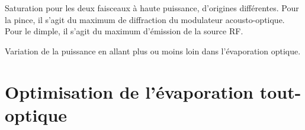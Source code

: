 Saturation pour les deux faisceaux à haute puissance, d'origines différentes. Pour la pince, il s'agit du maximum de diffraction du modulateur acousto-optique. Pour le dimple, il s'agit du maximum d'émission de la source RF. 

Variation de la puissance en allant plus ou moins loin dans l'évaporation optique.










\section{Optimisation de l'évaporation tout-optique}
\label{sc:evap_optique}

